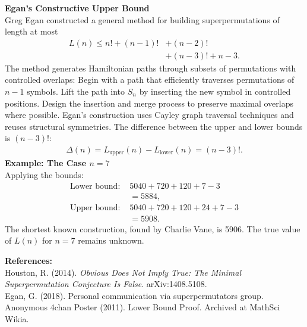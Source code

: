 \begin{technical}
\noindent\textbf{Egan's Constructive Upper Bound}\\
Greg Egan constructed a general method for building superpermutations of length at most
\begin{align*}
L(n) \leq n! + (n-1)! &+ (n-2)! \\
&+ (n-3)! + n - 3.
\end{align*}
The method generates Hamiltonian paths through subsets of permutations with controlled overlaps: Begin with a path that efficiently traverses permutations of $n-1$ symbols. Lift the path into $S_n$ by inserting the new symbol in controlled positions. Design the insertion and merge process to preserve maximal overlaps where possible. Egan's construction uses Cayley graph traversal techniques and reuses structural symmetries. The difference between the upper and lower bounds is $(n-3)!$:
\begin{align*}
\Delta(n) = L_{\text{upper}}(n) - L_{\text{lower}}(n) = (n-3)!.
\end{align*}
\noindent\textbf{Example: The Case $n = 7$}\\
Applying the bounds:
\begin{align}
\text{Lower bound: } & 5040 + 720 + 120 + 7 - 3\\
 &= 5884, \\
\text{Upper bound: } & 5040 + 720 + 120 + 24 + 7 - 3\\
 &= 5908.
\end{align}
The shortest known construction, found by Charlie Vane, is 5906. The true value of $L(n)$ for $n = 7$ remains unknown.

\noindent\textbf{References:}\\
Houston, R. (2014). \textit{Obvious Does Not Imply True: The Minimal Superpermutation Conjecture Is False}. arXiv:1408.5108.\\
Egan, G. (2018). Personal communication via superpermutators group.\\
Anonymous 4chan Poster (2011). Lower Bound Proof. Archived at MathSci Wikia.
\end{technical}
